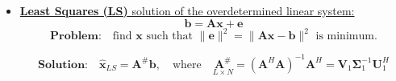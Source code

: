 \begin{itemize}
\[
\boldsymbol{\Sigma} =
\begin{bmatrix}
1.618 & 0 \\
0 & 0.618
\end{bmatrix}
\qquad
\mathbf{V} =
\begin{bmatrix}
0.5257 & -0.8507 \\
0.8507 & 0.5257
\end{bmatrix}
\]

\[
\mathbf{A}^{\#} = \mathbf{V} \boldsymbol{\Sigma}^{-1} \mathbf{U}^H
=
\begin{bmatrix}
1 & -1 \\
0 & 1
\end{bmatrix}
= \mathbf{A}^{-1}
\]
\[
\text{SVD of } \mathbf{A} \text{ when } \operatorname{rank}(\mathbf{A}) = r,\ \text{with } r \leq L < N
\]

\[
\boxed{
\underset{N \times L}{\mathbf{A}}
=
\underset{N \times N}{\mathbf{U}}
\;\;
\underset{N \times L}{\mathbf{\Sigma}}
\;\;
\underset{L \times L}{\mathbf{V}^H}
=
\begin{bmatrix}
\mathbf{U}_1 & \mathbf{U}_2
\end{bmatrix}
\begin{bmatrix}
\mathbf{\Sigma}_1 & 0 \\
0 & 0
\end{bmatrix}
\begin{bmatrix}
\mathbf{V}_1^H \\
\mathbf{V}_2^H
\end{bmatrix}
=
\underset{N\times r}{\mathbf{U}_1}
\;
\underset{r\times r}{\mathbf{\Sigma}_1}
\;
\underset{r\times L}{\mathbf{V}_1^H}
}
\]
\[
\underset{L \times N}{\mathbf{A}^{\#}}
=
\underset{L\times r}{\mathbf{V}_1}
\;
\underset{r\times r}{\mathbf{\Sigma}_1^{-1}}
\;
\underset{r\times N}{\mathbf{U}_1^H}
\]
\item \underline{\textbf{Least Squares (LS)} solution of the overdetermined linear system:}
\[
\mathbf{b} = \mathbf{A}\mathbf{x} + \mathbf{e}
\]
\vspace{-1em}
\[
\textbf{Problem:}\quad \text{find } \mathbf{x} \text{ such that }
\|\mathbf{e}\|^2 = \|\mathbf{A}\mathbf{x} - \mathbf{b}\|^2 \text{ is minimum.}
\]

\[
\textbf{Solution:}\quad
\hat{\mathbf{x}}_{LS} = \mathbf{A}^{\#}\mathbf{b}, \quad \text{where} \quad
\underset{L\times N}{\mathbf{A}^{\#}}
=
(\mathbf{A}^H\mathbf{A})^{-1}\mathbf{A}^H
=
\mathbf{V}_1 \boldsymbol{\Sigma}_1^{-1} \mathbf{U}_1^H
\]
\end{itemize}
